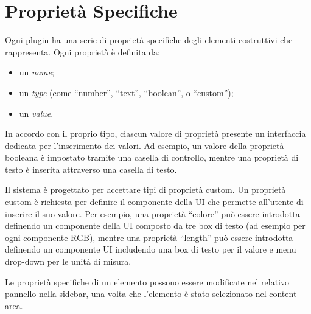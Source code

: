 \section{Propriet\`a Specifiche}
\label{sec:chapter_3_section_3}

\noindent

Ogni plugin ha una serie di proprietà specifiche degli elementi costruttivi che rappresenta.
Ogni propriet\`a \`e definita da:
\begin{itemize}
  \item un \emph{name};
  \item un \emph{type} (come ``number'', ``text'', ``boolean'', o ``custom'');
  \item un \emph{value}.
\end{itemize}
In accordo con il proprio tipo, ciascun valore di proprietà presente un interfaccia dedicata per l'inserimento dei valori.
Ad esempio, un valore della proprietà booleana è impostato tramite una casella di controllo,
mentre una proprietà di testo è inserita attraverso una casella di testo.

Il sistema \`e progettato per accettare tipi di propriet\`a custom. Un propriet\`a custom è richiesta per definire
il componente della UI che permette all'utente di inserire il suo valore.
Per esempio, una propriet\`a ``colore'' pu\`o essere introdotta definendo un componente della UI composto da tre box di testo
(ad esempio per ogni componente RGB), mentre una propriet\`a ``length'' pu\`o essere introdotta definendo un componente UI
includendo una box di testo per il valore e menu drop-down per le unità di misura.

Le propriet\`a specifiche di un elemento possono essere modificate nel relativo pannello nella sidebar, una volta che l'elemento
\`e stato selezionato nel content-area.
\newpage



